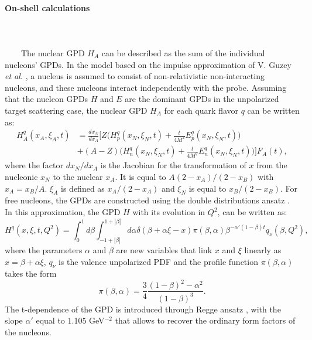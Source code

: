 \paragraph{On-shell calculations}
~\\
~\\  
~~~~The nuclear GPD $H_{A}$ can be described as the sum of the individual nucleons' GPDs. In the model based on the impulse approximation of V. Guzey {\it et al.} \cite{EMC_vadim_1, EMC_vadim_3}, a nucleus  is assumed to consist of non-relativistic non-interacting nucleons, and these nucleons interact independently with the probe. Assuming that the nucleon GPDs $H$ and $E$ are the dominant GPDs in the unpolarized target scattering case, the nuclear GPD $H_{A}$ for each quark flavor $q$ can be written as:
\begin{align}
H_{A}^{q}(x_A, \xi_{A}, t) &= \frac{dx_{N}}{dx_{A}} \Bigg[ Z \bigg( H^q_p(x_{N}, 
\xi_{N}, t) + \frac{t}{4 M^2} E^q_p(x_{N}, \xi_{N}, t) \bigg)\\ \nonumber
& + (A-Z) \bigg( H^q_n(x_{N}, \xi_{N}, t) + \frac{t}{4 M^2} E^q_n(x_{N}, \xi_{N}, t) 
\bigg) \Bigg] F_{A}(t),
\label{eq:guzey}
\end{align}
where the factor $dx_{N}/dx_{A}$ is the Jacobian for the transformation of $x$ 
from the nucleonic $x_N$ to the nuclear $x_{A}$. It is equal to $ 
A(2-x_{A})/(2-x_{B})$ with $x_A = x_B/A$. $\xi_{A}$ is defined as 
$x_{A}/(2-x_{A})$ and $\xi_{N}$ is equal to $x_B/(2-x_B)$. For free nucleons, the 
GPDs are constructed using the double distributions ansatz 
\cite{free_proton_GPDs}.  In this approximation, the GPD $H$ with its evolution 
in $Q^2$, can be written as:
\begin{equation}
H^{q}(x,\xi,t, Q^2) = \int_{0}^{1}d\beta \int_{-1+|\beta|}^{1+|\beta|} d\alpha \delta(\beta +\alpha \xi -x) \pi(\beta, \alpha) \beta^{-\alpha'(1-\beta)t} q_{\nu}(\beta, Q^2),
\end{equation} 
where the parameters $\alpha$ and $\beta$ are new variables that link $x$ and $\xi$ linearly as $x = \beta + \alpha \xi$, $q_{\nu}$ is the valence unpolarized PDF and the profile function $\pi(\beta, \alpha)$ takes the form
\begin{equation}
\pi(\beta, \alpha) = \frac{3}{4} \frac{(1-\beta)^2 - \alpha^2}{(1-\beta)^3}.
\end{equation}
The t-dependence of the GPD is introduced through Regge ansatz \cite{guidal_2}, with the slope $\alpha'$ equal to 1.105 GeV$^{-2}$ that allows to recover the ordinary form factors of the nucleons.\\ 

